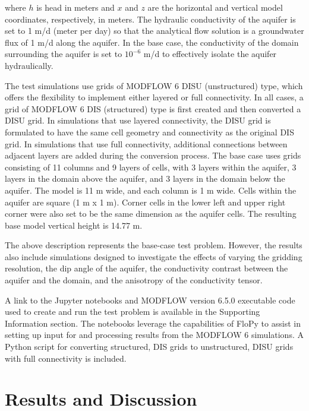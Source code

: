 \documentclass{article}
\begin{document}
\noindent where $h$ is head in meters and $x$ and $z$ are the horizontal and vertical model coordinates, respectively, in meters. The hydraulic conductivity of the aquifer is set to 1 m/d (meter per day) so that the analytical flow solution is a groundwater flux of 1 m/d along the aquifer. In the base case, the conductivity of the domain surrounding the aquifer is set to $10^{-6}$ m/d to effectively isolate the aquifer hydraulically.

The test simulations use grids of MODFLOW 6 DISU (unstructured) type, which offers the flexibility to implement either layered or full connectivity. In all cases, a grid of MODFLOW 6 DIS (structured) type is first created and then converted a DISU grid. In simulations that use layered connectivity, the DISU grid is formulated to have the same cell geometry and connectivity as the original DIS grid. In simulations that use full connectivity, additional connections between adjacent layers are added during the conversion process. The base case uses grids consisting of 11 columns and 9 layers of cells, with 3 layers within the aquifer, 3 layers in the domain above the aquifer, and 3 layers in the domain below the aquifer.  The model is 11 m wide, and each column is 1 m wide. Cells within the aquifer are square (1 m x 1 m). Corner cells in the lower left and upper right corner were also set to be the same dimension as the aquifer cells. The resulting base model vertical height is 14.77 m.  

The above description represents the base-case test problem. However, the results also include simulations designed to investigate the effects of varying the gridding resolution, the dip angle of the aquifer, the conductivity contrast between the aquifer and the domain, and the anisotropy of the conductivity tensor.

A link to the Jupyter notebooks and MODFLOW version 6.5.0 executable code used to create and run the test problem is available in the Supporting Information section. The notebooks leverage the capabilities of FloPy \citep{bakker2016scripting, hughes2024flopy} to assist in setting up input for and processing results from the MODFLOW 6 simulations. A Python script for converting structured, DIS grids to unstructured, DISU grids with full connectivity is included.

\section*{Results and Discussion}
\end{document}
